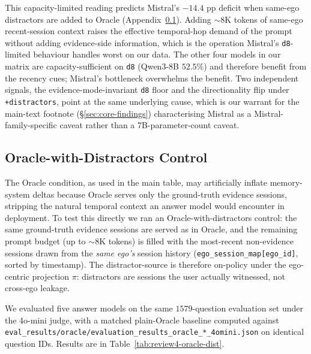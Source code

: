 This capacity-limited reading predicts Mistral's $-14.4$ pp deficit when same-ego distractors are added to Oracle (Appendix~\ref{app:review4-oracle-distract}). Adding $\sim\!8$K tokens of same-ego recent-session context raises the effective temporal-hop demand of the prompt without adding evidence-side information, which is the operation Mistral's \texttt{d8}-limited behaviour handles worst on our data. The other four models in our matrix are capacity-sufficient on \texttt{d8} (Qwen3-8B $52.5\%$) and therefore benefit from the recency cues; Mistral's bottleneck overwhelms the benefit. Two independent signals, the evidence-mode-invariant \texttt{d8} floor and the directionality flip under \texttt{+distractors}, point at the same underlying cause, which is our warrant for the main-text footnote (\S\ref{sec:core-findings}) characterising Mistral as a Mistral-family-specific caveat rather than a 7B-parameter-count caveat.

\subsection{Oracle-with-Distractors Control}
\label{app:review4-oracle-distract}

The Oracle condition, as used in the main table, may artificially inflate memory-system deltas because Oracle serves only the ground-truth evidence sessions, stripping the natural temporal context an answer model would encounter in deployment. To test this directly we ran an Oracle-with-distractors control: the same ground-truth evidence sessions are served as in Oracle, and the remaining prompt budget (up to $\sim\!8$K tokens) is filled with the most-recent non-evidence sessions drawn from the \emph{same ego's} session history (\texttt{ego\_session\_map[ego\_id]}, sorted by timestamp). The distractor-source is therefore on-policy under the ego-centric projection $\pi$: distractors are sessions the user actually witnessed, not cross-ego leakage.

We evaluated five answer models on the same $1579$-question evaluation set under the 4o-mini judge, with a matched plain-Oracle baseline computed against \texttt{eval\_results/oracle/evaluation\_results\_oracle\_*\_4omini.json} on identical question IDs. Results are in Table~\ref{tab:review4-oracle-dist}.

